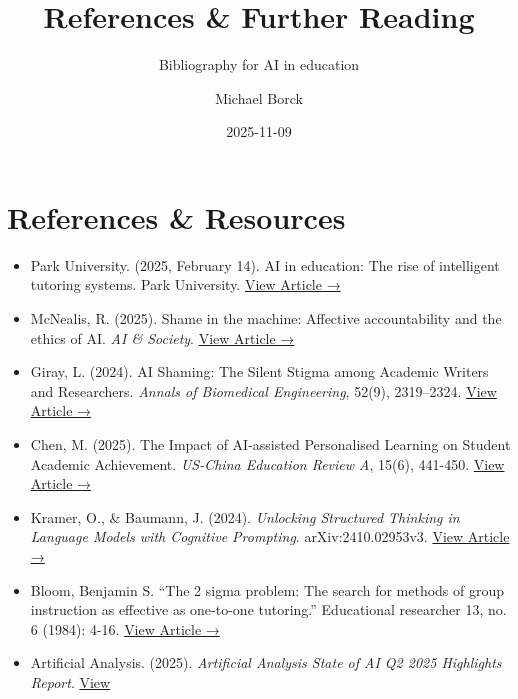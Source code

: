 \documentclass[
  11pt,
  letterpaper,
  DIV=11,
  numbers=noendperiod]{scrartcl}
\title{References \& Further Reading}
\subtitle{Bibliography for AI in education}
\author{Michael Borck}
\date{2025-11-09}
\renewcommand*\contentsname{Table of contents}
\newcommand\contentsname{Table of contents}
\begin{document}
\maketitle

\renewcommand*\contentsname{Table of contents}
{
\hypersetup{linkcolor=}
\setcounter{tocdepth}{2}
\tableofcontents
}

\section{References \& Resources}\label{references-resources}

\begin{itemize}
\item
  Park University. (2025, February 14). AI in education: The rise of
  intelligent tutoring systems. Park University.
  \href{https://www.park.edu/blog/ai-in-education-the-rise-of-intelligent-tutoring-systems/}{View
  Article →}
\item
  McNealis, R. (2025). Shame in the machine: Affective accountability
  and the ethics of AI. \emph{AI \& Society}.
  \href{https://link.springer.com/article/10.1007/s00146-025-02472-x}{View
  Article →}
\item
  Giray, L. (2024). AI Shaming: The Silent Stigma among Academic Writers
  and Researchers. \emph{Annals of Biomedical Engineering}, 52(9),
  2319--2324. \href{https://pubmed.ncbi.nlm.nih.gov/38977530/}{View
  Article →}
\item
  Chen, M. (2025). The Impact of AI-assisted Personalised Learning on
  Student Academic Achievement. \emph{US-China Education Review A},
  15(6), 441-450.
  \href{https://www.google.com/search?q=https://doi.org/10.17265/2161-623X/2025.06.008}{View
  Article →}
\item
  Kramer, O., \& Baumann, J. (2024). \emph{Unlocking Structured Thinking
  in Language Models with Cognitive Prompting}. arXiv:2410.02953v3.
  \href{https://arxiv.org/abs/2410.02953}{View Article →}
\item
  Bloom, Benjamin S. ``The 2 sigma problem: The search for methods of
  group instruction as effective as one-to-one tutoring.'' Educational
  researcher 13, no. 6 (1984): 4-16.
  \href{https://journals.sagepub.com/doi/pdf/10.3102/0013189X013006004}{View
  Article →}
\item
  Artificial Analysis. (2025). \emph{Artificial Analysis State of AI Q2
  2025 Highlights Report}.
  \href{https://artificialanalysis.ai/downloads/state-of-ai/2025/Q2-2025-Artificial-Analysis-State-of-AI-Highlights-Report.pdf}{View
}
\end{itemize}
\end{document}
